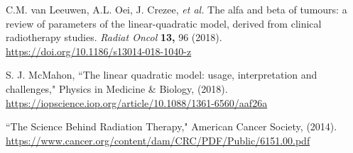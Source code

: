 \documentclass[]{article}
\begin{document}
C.M. van Leeuwen, A.L. Oei, J. Crezee, \textit{et al.} The alfa and beta
of tumours: a review of parameters of the linear-quadratic model,
derived from clinical radiotherapy studies. \textit{Radiat Oncol}
\textbf{13,} 96 (2018).
\href{https://doi.org/10.1186/s13014-018-1040-z}{https://doi.org/10.1186/s13014-018-1040-z}

S. J. McMahon, ``The linear quadratic model: usage, interpretation and
challenges," Physics in Medicine \& Biology, (2018).
\href{https://iopscience.iop.org/article/10.1088/1361-6560/aaf26a}{https://iopscience.iop.org/article/10.1088/1361-6560/aaf26a}

``The Science Behind Radiation Therapy," American Cancer Society,
(2014).
\href{https://www.cancer.org/content/dam/CRC/PDF/Public/6151.00.pdf}{https://www.cancer.org/content/dam/CRC/PDF/Public/6151.00.pdf}
\end{document}
